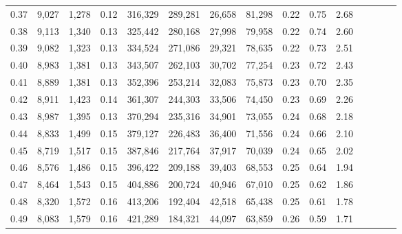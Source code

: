 \begin{tabular}{rrrcrrrrrrrrrrr}
0.37 &   9,027 &   1,278 &                                       0.12 &  316,329 &  289,281 &   26,658 &   81,298 &  0.22 &  0.75 &                         2.68 \\
0.38 &   9,113 &   1,340 &                                       0.13 &  325,442 &  280,168 &   27,998 &   79,958 &  0.22 &  0.74 &                         2.60 \\
0.39 &   9,082 &   1,323 &                                       0.13 &  334,524 &  271,086 &   29,321 &   78,635 &  0.22 &  0.73 &                         2.51 \\
0.40 &   8,983 &   1,381 &                                       0.13 &  343,507 &  262,103 &   30,702 &   77,254 &  0.23 &  0.72 &                         2.43 \\
0.41 &   8,889 &   1,381 &                                       0.13 &  352,396 &  253,214 &   32,083 &   75,873 &  0.23 &  0.70 &                         2.35 \\
0.42 &   8,911 &   1,423 &                                       0.14 &  361,307 &  244,303 &   33,506 &   74,450 &  0.23 &  0.69 &                         2.26 \\
0.43 &   8,987 &   1,395 &                                       0.13 &  370,294 &  235,316 &   34,901 &   73,055 &  0.24 &  0.68 &                         2.18 \\
0.44 &   8,833 &   1,499 &                                       0.15 &  379,127 &  226,483 &   36,400 &   71,556 &  0.24 &  0.66 &                         2.10 \\
0.45 &   8,719 &   1,517 &                                       0.15 &  387,846 &  217,764 &   37,917 &   70,039 &  0.24 &  0.65 &                         2.02 \\
0.46 &   8,576 &   1,486 &                                       0.15 &  396,422 &  209,188 &   39,403 &   68,553 &  0.25 &  0.64 &                         1.94 \\
0.47 &   8,464 &   1,543 &                                       0.15 &  404,886 &  200,724 &   40,946 &   67,010 &  0.25 &  0.62 &                         1.86 \\
0.48 &   8,320 &   1,572 &                                       0.16 &  413,206 &  192,404 &   42,518 &   65,438 &  0.25 &  0.61 &                         1.78 \\
0.49 &   8,083 &   1,579 &                                       0.16 &  421,289 &  184,321 &   44,097 &   63,859 &  0.26 &  0.59 &                         1.71 \\

\end{tabular}
